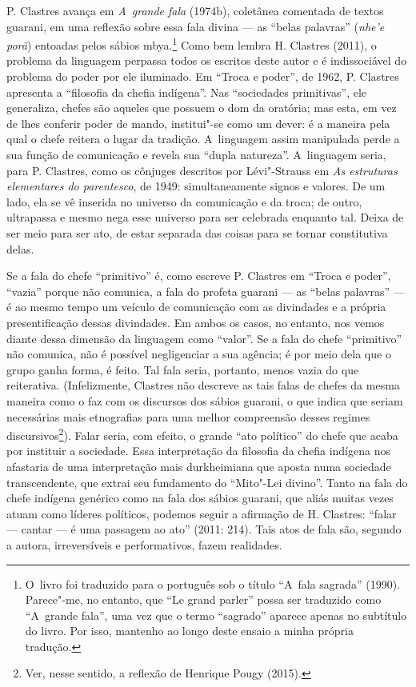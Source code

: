 P. Clastres avança em \emph{A~grande fala} (1974b), coletânea comentada de
textos guarani, em uma reflexão sobre essa fala divina --- as ``belas
palavras'' (\emph{nhe’e porã}) entoadas pelos sábios mbya.\footnote{O~livro foi
traduzido para o português sob o título ``A~fala sagrada'' (1990).
Parece"-me, no entanto, que ``Le grand parler'' possa ser traduzido como
``A~grande fala'', uma vez que o termo ``sagrado'' aparece apenas no
subtítulo do livro. Por isso, mantenho ao longo deste ensaio a minha
própria tradução.} Como bem lembra H. Clastres (2011), o problema da
linguagem perpassa todos os escritos deste autor e é indissociável do
problema do poder por ele iluminado. Em ``Troca e poder'', de 1962, P.
Clastres apresenta a ``filosofia da chefia indígena''. Nas ``sociedades
primitivas'', ele generaliza, chefes são aqueles que possuem o dom da
oratória; mas esta, em vez de lhes conferir poder de mando, institui"-se
como um dever: é a maneira pela qual o chefe reitera o lugar da
tradição. A~linguagem assim manipulada perde a sua função de
comunicação e revela sua ``dupla natureza''. A~linguagem seria, para P.
Clastres, como os cônjuges descritos por Lévi"-Strauss em \emph{As estruturas
elementares do parentesco}, de 1949: simultaneamente signos e valores.
De um lado, ela se vê inserida no universo da comunicação e da troca;
de outro, ultrapassa e mesmo nega esse universo para ser celebrada
enquanto tal. Deixa de ser meio para ser ato, de estar separada das
coisas para se tornar constitutiva delas. 

Se a fala do chefe ``primitivo'' é, como escreve P. Clastres em ``Troca e
poder'', ``vazia'' porque não comunica, a fala do profeta guarani --- as
``belas palavras'' --- é ao mesmo tempo um veículo de comunicação com as
divindades e a própria presentificação dessas divindades. Em ambos os
casos, no entanto, nos vemos diante dessa dimensão da linguagem como
``valor''. Se a fala do chefe ``primitivo'' não comunica, não é possível
negligenciar a sua agência; é por meio dela que o grupo ganha forma, é
feito. Tal fala seria, portanto, menos vazia do que reiterativa.
(Infelizmente, Clastres não descreve as tais falas de chefes da mesma
maneira como o faz com os discursos dos sábios guarani, o que indica
que seriam necessárias mais etnografias para uma melhor compreensão
desses regimes discursivos\footnote{Ver, nesse sentido, a reflexão de
Henrique Pougy (2015).}). Falar seria, com efeito, o grande ``ato
político'' do chefe que acaba por instituir a sociedade. Essa
interpretação da filosofia da chefia indígena nos afastaria de uma
interpretação mais durkheimiana que aposta numa sociedade
transcendente, que extrai seu fundamento do ``Mito"-Lei divino''. Tanto na
fala do chefe indígena genérico como na fala dos sábios guarani, que
aliás muitas vezes atuam como líderes políticos, podemos seguir a
afirmação de H. Clastres: ``falar --- cantar --- é uma passagem ao ato''
(2011: 214). Tais atos de fala são, segundo a autora, irreversíveis e
performativos, fazem realidades. 

